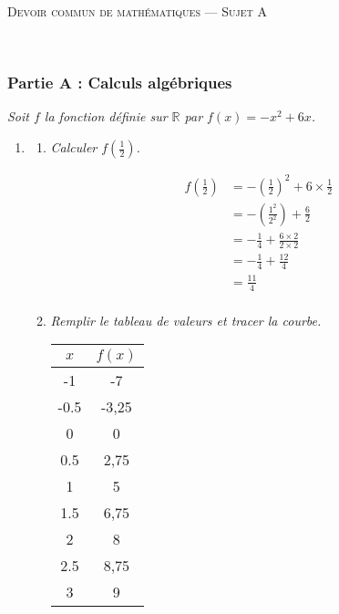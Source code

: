 \documentclass[12pt]{article}
\begin{document}
\begin{center}
  \textsc{Devoir commun de mathématiques --- Sujet A}
\end{center}

\begin{exercice}~

  \subsubsection*{Partie A : Calculs algébriques}
  \emph{Soit $f$ la fonction définie sur $\mathbb{R}$ par $f(x)=-x^2+6x$.}
  \begin{enumerate}
    \item
      \begin{multicols}{2}
      \begin{enumerate}
        \item \emph{Calculer $f\left(\frac{1}{2}\right)$.}

          \begin{align*}
            f\left(\frac{1}{2}\right) &= -\left(\frac{1}{2}\right)^2+6\times\frac{1}{2}\\
                                      &= -\left(\frac{1^2}{2^2}\right)+\frac{6}{2}\\
                                      &= -\frac{1}{4}+\frac{6\times2}{2\times2}\\
                                      &= -\frac{1}{4}+\frac{12}{4}\\
                                      &= \frac{11}{4}\\
          \end{align*}

          \columnbreak

        \item \emph{Remplir le tableau de valeurs et tracer la courbe.}
            \begin{multicols}{2}
                \begin{tabular}{|c|c|}
                  \hline
                  $x$ & $f(x)$ \\
                  \hline
                  -1 & -7 \\
                  \hline
                  -0.5 & -3,25 \\
                  \hline
                  0 & 0 \\
                  \hline
                  0.5 & 2,75 \\
                  \hline
                  1 & 5 \\
                  \hline
                  1.5 & 6,75 \\
                  \hline
                  2 & 8 \\
                  \hline
                  2.5 & 8,75 \\
                  \hline
                  3 & 9 \\
                  \hline
                \end{tabular}


\end{multicols}
\end{enumerate}
\end{multicols}
\end{enumerate}
\end{exercice}
\end{document}
